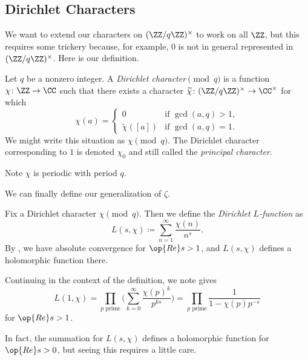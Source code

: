 \documentclass[../notes.tex]{subfiles}
\begin{document}
\subsection{Dirichlet Characters}
We want to extend our characters on $(\ZZ/q\ZZ)^\times$ to work on all $\ZZ$, but this requires some trickery because, for example, $0$ is not in general represented in $(\ZZ/q\ZZ)^\times$. Here is our definition.
\begin{definition}
	Let $q$ be a nonzero integer. A \textit{Dirichlet character$\pmod q$} is a function $\chi\colon\ZZ\to\CC$ such that there exists a character $\widetilde\chi\colon(\ZZ/q\ZZ)^\times\to\CC^\times$ for which
	\[\chi(a)=\begin{cases}
		0 & \text{if }\gcd(a,q)>1, \\
		\widetilde\chi([a]) & \text{if }\gcd(a,q)=1.
	\end{cases}\]
	We might write this situation as $\chi\pmod q$. The Dirichlet character corresponding to $1$ is denoted $\chi_0$ and still called the \textit{principal character}.
\end{definition}
\begin{remark}
	Note $\chi$ is periodic with period $q$.
\end{remark}
We can finally define our generalization of $\zeta$.
\begin{definition}
	Fix a Dirichlet character $\chi\pmod q$. Then we define the \textit{Dirichlet $L$-function} as
	\[L(s,\chi)\coloneqq\sum_{n=1}^\infty\frac{\chi(n)}{n^s}.\]
	By , we have absolute convergence for $\op{Re}s>1$, and $L(s,\chi)$ defines a holomorphic function there.
\end{definition}
\begin{remark}
	Continuing in the context of the definition, we note  gives
	\[L(1,\chi)=\prod_{p\text{ prime}}\Bigg(\sum_{k=0}^\infty\frac{\chi(p)^k}{p^{ks}}\Bigg)=\prod_{p\text{ prime}}\frac1{1-\chi(p)p^{-s}}\]
	for $\op{Re}s>1$.
\end{remark}
In fact, the summation for $L(s,\chi)$ defines a holomorphic function for $\op{Re}s>0$, but seeing this requires a little care.
\end{document}
